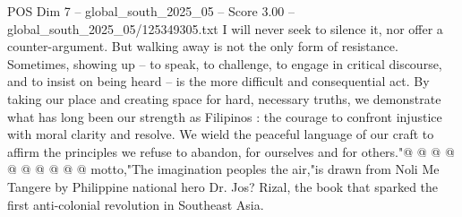 \begin{textsample}{POS Dim 7 – global\_south\_2025\_05 – Score 3.00 – global\_south\_2025\_05/125349305.txt}
I will never seek to silence it, nor offer a counter-argument.
But walking away is not the only form of resistance.
Sometimes, showing up -- to speak, to challenge, to engage in critical discourse, and to insist on being heard -- is the more difficult and consequential act.
By taking our place and creating space for hard, necessary truths, we demonstrate what has long been our strength as Filipinos : the courage to confront injustice with moral clarity and resolve.
We wield the peaceful language of our craft to affirm the principles we refuse to abandon, for ourselves and for others."@ @ @ @ @ @ @ @ @ @ motto,"The imagination peoples the air,"is drawn from Noli Me Tangere by Philippine national hero Dr.
Jos?
Rizal, the book that sparked the first anti-colonial revolution in Southeast Asia.

\end{textsample}
